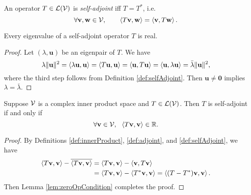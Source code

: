 \begin{defn}
  \label{def:selfAdjoint}
  An operator $T\in {\cal L}({\cal V})$
  is \emph{self-adjoint} iff $T=T^*$,
  i.e. 
  \begin{equation}
    \label{eq:selfAdjoint}
    \forall \mathbf{v},\mathbf{w} \in {\cal V},
    \qquad \left\langle T\mathbf{v},\mathbf{w} \right\rangle = \left\langle \mathbf{v},T\mathbf{w} \right\rangle.
  \end{equation}
\end{defn}

\begin{lem}
  \label{lem:selfAdjointEigenvalueReal}
  Every eigenvalue of a self-adjoint operator $T$ is real.
\end{lem}
\begin{proof}
  Let $(\lambda,\mathbf{u})$ be an eigenpair of $T$.
  We have
  \begin{displaymath}
    \lambda \|\mathbf{u}\|^2
    = \left\langle \lambda \mathbf{u}, \mathbf{u} \right\rangle
    = \left\langle T \mathbf{u}, \mathbf{u} \right\rangle
    = \left\langle \mathbf{u}, T\mathbf{u} \right\rangle
    = \left\langle \mathbf{u}, \lambda\mathbf{u} \right\rangle
    = \bar{\lambda} \|\mathbf{u}\|^2,
  \end{displaymath}
  where the third step follows from Definition \ref{def:selfAdjoint}.
  Then $\mathbf{u}\ne \mathbf{0}$ implies $\lambda=\bar{\lambda}$.
\end{proof}

\begin{thm}
  \label{thm:selfAdjointSufNecConds}
  Suppose ${\cal V}$ is a complex inner product space
  and $T\in {\cal L}({\cal V})$.
  Then $T$ is self-adjoint if and only if
  \begin{equation}
    \label{eq:selfAdjointSufNecConds}
    \forall \mathbf{v}\in {\cal V},\ \ \left\langle T\mathbf{v}, \mathbf{v} \right\rangle\in \mathbb{R}.
  \end{equation}
\end{thm}
\begin{proof}
  By Definitions \ref{def:innerProduct}, \ref{def:adjoint}, 
  and \ref{def:selfAdjoint},
  we have
  \begin{align*}
    \left\langle T\mathbf{v},\mathbf{v} \right\rangle - \overline{\left\langle T\mathbf{v},\mathbf{v} \right\rangle}
    &= \left\langle T\mathbf{v},\mathbf{v} \right\rangle - \left\langle \mathbf{v},T\mathbf{v} \right\rangle
    \\
    &= \left\langle T\mathbf{v},\mathbf{v} \right\rangle - \left\langle T^*\mathbf{v},\mathbf{v} \right\rangle
      = \left\langle (T-T^*)\mathbf{v},\mathbf{v} \right\rangle.
  \end{align*}
  Then Lemma \ref{lem:zeroOpCondition} completes the proof.
\end{proof}

